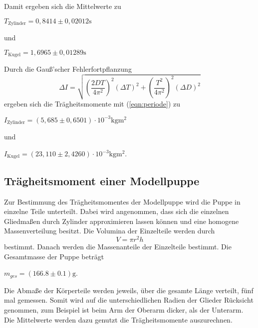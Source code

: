 Damit ergeben sich die Mittelwerte zu 
\begin{center}
  $T_{\text{Zylinder}} = 0,8414 \pm 0,02012 \si{\second} $
\end{center}
und
\begin{center}
  $ T_{\text{Kugel}} = 1,6965 \pm 0,01289 \si{\second} $
\end{center}
Durch die Gauß'scher Fehlerfortpflanzung %
\begin{equation}
  \Delta I = \sqrt{ (\frac{2DT}{4\pi^2})^2  (\Delta T)^2 + (\frac{T^2}{4\pi^2})^2 (\Delta D)^2}
  \label{eqn:Fehlerfortpflanzung}
\end{equation}
ergeben sich die Trägheitsmomente mit (\ref{eqn:periode}) zu
\begin{center}
  $ I_{\text{Zylinder}} = (5,685 \pm 0,6501) \cdot 10^{-3} \si{\kilogram\meter^2} $ 
\end{center}
und
\begin{center}
  $ I_{\text{Kugel}} = (23,110 \pm 2,4260) \cdot 10^{-3} \si{\kilogram\meter^2} $.
\end{center}


\subsection{Trägheitsmoment einer Modellpuppe}
\label{sec:Trägheitsmoment einer Modellpuppe}

Zur Bestimmung des Trägheitsmomentes der Modellpuppe wird die Puppe in einzelne Teile unterteilt. Dabei wird angenommen,
dass sich die einzelnen Gliedmaßen durch Zylinder approximieren lassen können und eine homogene Massenverteilung besitzt. Die
Volumina der Einzelteile werden durch
\begin{equation}
  V = \pi r^2h
  \label{eqn:Volumen}
\end{equation}
 bestimmt. Danach werden die Massenanteile der Einzelteile bestimmt. Die Gesamtmasse der Puppe beträgt 
\begin{center}
  $m_{ges} = (166.8\pm 0.1)\si{\gram}$.
\end{center}
Die Abmaße der Körperteile werden jeweils, über die gesamte Länge verteilt, fünf mal gemessen. Somit wird auf die unterschiedlichen
Radien der Glieder Rücksicht genommen, zum Beispiel ist beim Arm der Oberarm dicker, als der Unterarm. Die Mittelwerte werden dazu genutzt die
Trägheitsmomente auszurechnen.

